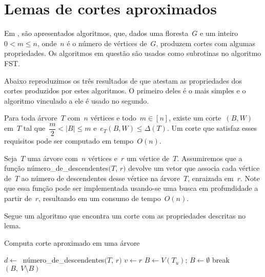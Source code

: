 \section {Lemas de cortes aproximados}

Em \cite{Schmidt15}, são apresentados 
algoritmos, que, dados uma floresta~$G$ e um 
inteiro~${0<m\le n}$, onde~$n$ é o número de vértices de~$G$, 
produzem cortes com algumas propriedades.
Os algoritmos em questão são usados como subrotinas no algoritmo
FST.

Abaixo reproduzimos os três resultados de \cite{Schmidt15} que 
atestam as propriedades dos cortes produzidos por estes algoritmos.
O primeiro deles é o mais simples e o algoritmo vinculado a ele
é usado no segundo.

\bigskip

\begin{lem}[]
\label{lema:simpleApproxCutTree}
	Para toda árvore~$T$ com~$n$ vértices e todo~${m \in [n]}$,
	existe um corte~$(B,W)$ em~$T$ tal 
	que~${\dfrac{m}{2} <|B| \le m}$ e~${e_T(B,W) \le \Delta(T)}$.
	Um corte que satisfaz esses requisitos pode ser computado em
	tempo~$O(n)$.
\end{lem}

\bigskip

Seja~$T$ uma árvore com~$n$ vértices e~$r$ um vértice de~$T$. 
Assumiremos que
a função {\sc número\_de\_descendentes}$(T$, $r)$ devolve um vetor
que associa cada vértice de~$T$ ao número de descendentes desse 
vértice na árvore~$T$, enraizada em~$r$. 
Note que essa função 
pode ser implementada usando-se uma busca em profundidade
a partir de~$r$,
resultando em um consumo de tempo~$O(n)$.


Segue um algoritmo que encontra um corte com as propriedades 
descritas no lema.

\bigskip

\begin{algorithm}[H]
\label{alg:simpleApproxCutTree}

	\caption{Computa corte aproximado em uma árvore}
		$d \gets~$ {\sc número\_de\_descendentes}$(T$, $r)$\;
		$v \gets r$\;
		{
			$B\gets V(T_u)$; \quad
		}
		{
		$B \gets \emptyset$\;
		{
			{
				break\;
			}
		}
		}
	\Return $(B,\ V\setminus B)$

\end{algorithm}	

